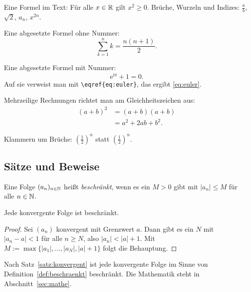 Eine Formel im Text: Für alle $x \in \mathbb{R}$ gilt $x^2 \geq 0$.
Brüche, Wurzeln und Indizes: $\frac{a}{b}$, $\sqrt{2}$, $a_n$, $x^{2n}$.

Eine abgesetzte Formel ohne Nummer:
\[
	\sum_{k=1}^{n} k = \frac{n(n+1)}{2} .
\]

Eine abgesetzte Formel mit Nummer:
\begin{equation}\label{eq:euler}
	\mathrm{e}^{\mathrm{i}\pi} + 1 = 0 .
\end{equation} 
Auf sie verweist man mit \verb|\eqref{eq:euler}|, das ergibt \eqref{eq:euler}.

Mehrzeilige Rechnungen richtet man am Gleichheitszeichen aus:
\begin{align*}
	(a+b)^2 &= (a+b)(a+b) \\
	        &= a^2 + 2ab + b^2 .
\end{align*}

Klammern um Brüche: $\left( \frac{1}{2} \right)^n$ statt $(\frac{1}{2})^n$.

\subsection{Sätze und Beweise}

\begin{definition}\label{def:beschraenkt}
Eine Folge $(a_n)_{n\in\mathbb{N}}$ heißt \emph{beschränkt}, wenn es ein $M > 0$ gibt mit $|a_n| \leq M$ für alle $n \in \mathbb{N}$.
\end{definition}

\begin{satz}\label{satz:konvergent}
Jede konvergente Folge ist beschränkt.
\end{satz}

\begin{proof}
Sei $(a_n)$ konvergent mit Grenzwert $a$.
Dann gibt es ein $N$ mit $|a_n - a| < 1$ für alle $n \geq N$, also $|a_n| < |a| + 1$.
Mit $M := \max\{|a_1|, \dots, |a_{N}|, |a| + 1\}$ folgt die Behauptung.
\end{proof}

Nach Satz~\ref{satz:konvergent} ist jede konvergente Folge im Sinne von Definition~\ref{def:beschraenkt} beschränkt.
Die Mathematik steht in Abschnitt~\ref{sec:mathe}.

